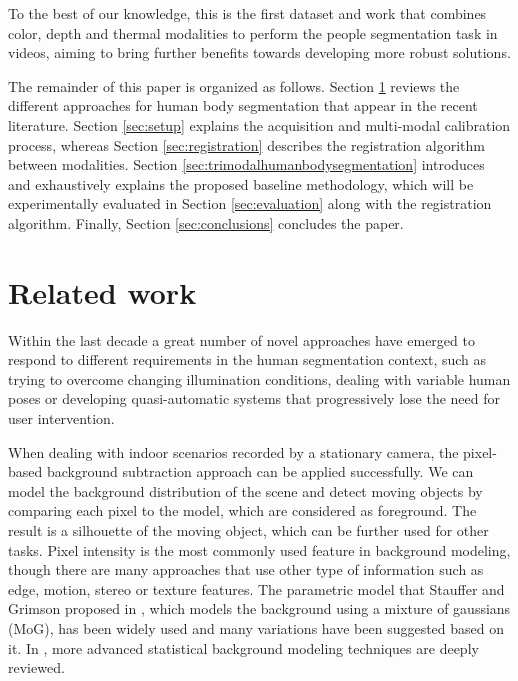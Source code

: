 \documentclass[10pt,twocolumn,letterpaper]{article}
\begin{document}
To the best of our knowledge, this is the first dataset and work that combines color, depth and thermal modalities to perform the people segmentation task in videos, aiming to bring further benefits towards developing more robust solutions.

The remainder of this paper is organized as follows. Section \ref{sec:relatedwork} reviews the different approaches for human body segmentation that appear in the recent literature. Section \ref{sec:setup} explains the acquisition and multi-modal calibration process, whereas Section \ref{sec:registration} describes the registration algorithm between modalities. Section \ref{sec:trimodalhumanbodysegmentation} introduces and exhaustively explains the proposed baseline methodology, which will be experimentally evaluated in Section \ref{sec:evaluation} along with the registration algorithm. Finally, Section \ref{sec:conclusions} concludes the paper.

\section{Related work}
\label{sec:relatedwork}

Within the last decade a great number of novel approaches have emerged to respond to different requirements in the human segmentation context, such as trying to overcome changing illumination conditions, dealing with variable human poses or developing quasi-automatic systems that progressively lose the need for user intervention.
 
 When dealing with indoor scenarios recorded by a stationary camera, the pixel-based background subtraction approach can be applied successfully. We can model the background distribution of the scene and detect moving objects by comparing each pixel to the model, which are considered as foreground. The result is a silhouette of the moving object, which can be further used for other tasks. Pixel intensity is the most commonly used feature in background modeling, though there are many approaches that use other type of information such as edge, motion, stereo or texture features. The parametric model that Stauffer and Grimson proposed in \cite{stauffer1999adaptive}, which models the background using a mixture of gaussians (MoG), has been widely used and many variations have been suggested based on it. In \cite{bouwmans2011recent}, more advanced statistical background modeling techniques are deeply reviewed. 
 
\end{document}
